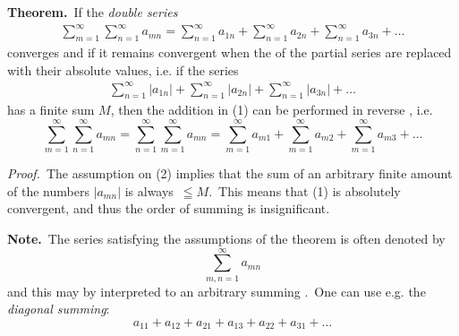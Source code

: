 \documentclass[12pt]{article}
\theoremstyle{definition}
\begin{document}
\textbf{Theorem.}\, If the {\em double series}
\begin{align}
\sum_{m=1}^\infty\sum_{n=1}^\infty a_{mn} =
  \sum_{n=1}^\infty a_{1n}+\sum_{n=1}^\infty a_{2n}+\sum_{n=1}^\infty a_{3n}
+\ldots
\end{align}
converges and if it remains convergent when the  of the partial series are replaced with their absolute values, i.e. if the series
\begin{align}
\sum_{n=1}^\infty|a_{1n}|+\sum_{n=1}^\infty|a_{2n}|+\sum_{n=1}^\infty|a_{3n}|
+\ldots
\end{align}
has a finite sum $M$, then the addition in (1) can be performed in reverse , i.e.
$$\sum_{m=1}^\infty\sum_{n=1}^\infty a_{mn} = \sum_{n=1}^\infty\sum_{m=1}^\infty a_{mn} =
  \sum_{m=1}^\infty a_{m1}+\sum_{m=1}^\infty a_{m2}+\sum_{m=1}^\infty a_{m3}
+\ldots$$

{\em Proof.}\, The assumption on (2) implies that the sum of an arbitrary finite amount of the numbers $|a_{mn}|$ is always\ $\leqq M$.\, This means that (1) is absolutely convergent, and thus the order of summing is insignificant.

\textbf{Note.}\, The series satisfying the assumptions of the theorem is often denoted by
$$\sum_{m,n=1}^\infty a_{mn}$$
and this may by interpreted to  an arbitrary summing .\, One can use e.g. the {\em diagonal summing}:
$$a_{11}+a_{12}+a_{21}+a_{13}+a_{22}+a_{31}+\ldots$$
\end{document}
